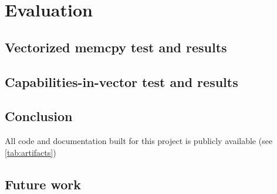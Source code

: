 \chapter{Evaluation\label{chap:eval}}


\section{Vectorized memcpy test and results}


\section{Capabilities-in-vector test and results}

\section{Conclusion}

All code and documentation built for this project is publicly available (see \cref{tab:artifacts})


\section{Future work}